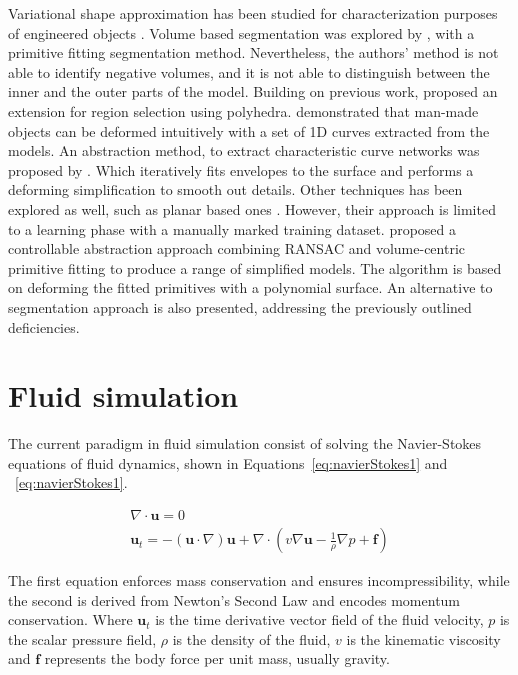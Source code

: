 Variational shape approximation has been studied for characterization purposes of engineered objects \cite{Cohen-Steiner2004}.
Volume based segmentation was explored by \cite{Attene2006}, with a primitive fitting segmentation method.
Nevertheless, the authors' method is not able to identify negative volumes, and it is not able to distinguish between the inner and the outer parts of the model.
Building on previous work, \cite{Attene2008} proposed an extension for region selection using polyhedra.
\cite{Gal2009} demonstrated that man-made objects can be deformed intuitively with a set of 1D curves extracted from the models.
An abstraction method, to extract characteristic curve networks was proposed by \cite{Mehra2009}.
Which iteratively fits envelopes to the surface and performs a deforming simplification to smooth out details.
Other techniques has been explored as well, such as planar based ones \cite{McCrae2011}.
However, their approach is limited to a learning phase with a manually marked training dataset.
\cite{Yumer2012} proposed a controllable abstraction approach combining RANSAC and volume-centric primitive fitting to produce a range of simplified models.
The algorithm is based on deforming the fitted primitives with a polynomial surface.
An alternative to \cite{Attene2006} segmentation approach is also presented, addressing the previously outlined deficiencies.

\section{Fluid simulation}
\label{prevWorkFluidSim}

The current paradigm in fluid simulation consist of solving the Navier-Stokes equations of fluid dynamics, shown in Equations~\ref{eq:navierStokes1} and  ~\ref{eq:navierStokes1}.

\begin{gather}
\label{eq:navierStokes1}
\nabla \cdot \mathbf{u} = 0\\
\label{eq:navierStokes2}
\mathbf{u}_t = -(\mathbf{u} \cdot \nabla)\mathbf{u} + \nabla \cdot ( v \nabla \mathbf{u} - \frac{1}{\rho} \nabla p + \mathbf{f} )
\end{gather}

The first equation enforces mass conservation and ensures incompressibility, while the second is derived from Newton's Second Law and encodes momentum conservation.
Where $\mathbf{u}_t$ is the time derivative vector field of the fluid velocity, $p$  is the scalar pressure field, $\rho$ is the density of the fluid, $v$ is the kinematic viscosity and $\mathbf{f}$ represents the body force per unit mass, usually gravity.

